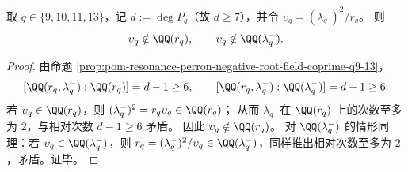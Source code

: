 \begin{proposition}\label{prop:pom-resonance-newman-not-in-single-root-fields-q9-13}
取 \(q\in\{9,10,11,13\}\)，记 \(d:=\deg P_q\)（故 \(d\ge 7\)），并令
\(\upsilon_q=(\lambda_q^-)^2/r_q\)。
则
\[
\upsilon_q\notin\QQ(r_q),
\qquad
\upsilon_q\notin\QQ(\lambda_q^-).
\]
\end{proposition}
\begin{proof}
由命题 \ref{prop:pom-resonance-perron-negative-root-field-coprime-q9-13}，
\[
[\QQ(r_q,\lambda_q^-):\QQ(r_q)]=d-1\ge 6,
\qquad
[\QQ(r_q,\lambda_q^-):\QQ(\lambda_q^-)]=d-1\ge 6.
\]
若 \(\upsilon_q\in\QQ(r_q)\)，则 \((\lambda_q^-)^2=r_q\upsilon_q\in\QQ(r_q)\)；
从而 \(\lambda_q^-\) 在 \(\QQ(r_q)\) 上的次数至多为 \(2\)，与相对次数 \(d-1\ge 6\) 矛盾。
因此 \(\upsilon_q\notin\QQ(r_q)\)。
对 \(\QQ(\lambda_q^-)\) 的情形同理：若 \(\upsilon_q\in\QQ(\lambda_q^-)\)，则 \(r_q=(\lambda_q^-)^2/\upsilon_q\in\QQ(\lambda_q^-)\)，同样推出相对次数至多为 \(2\)，矛盾。证毕。
\end{proof}

\endinput
